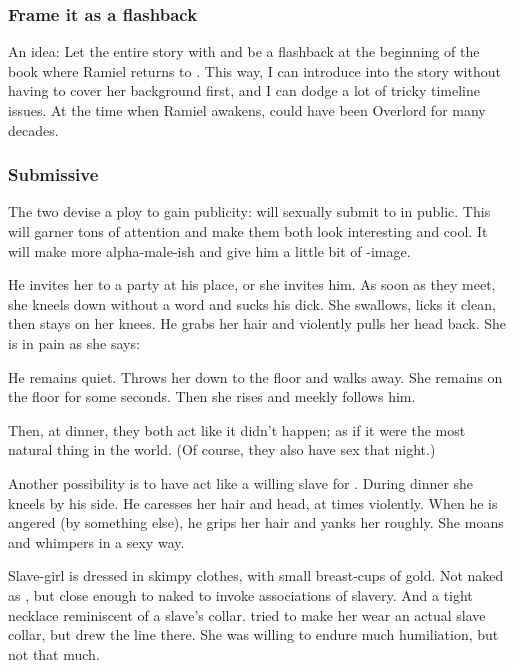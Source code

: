 \subsubsection{Frame it as a flashback}
An idea: Let the entire story with \Cishiel and \Dasteron be a flashback at the beginning of the book where Ramiel returns to \Mystraacht. 
This way, I can introduce \Cishiel into the story without having to cover her background first, and I can dodge a lot of tricky timeline issues. 
At the time when Ramiel awakens, \Dasteron could have been Overlord for many decades. 





\subsubsection{Submissive \Cishiel}
The two devise a ploy to gain publicity: 
\Cishiel{} will sexually submit to \Dasteron{} in public. 
This will garner tons of attention and make them both look interesting and cool. 
It will make \Dasteron{} more alpha-male-ish and give him a little bit of \Zachirah-image. 

He invites her to a party at his place, or she invites him. 
As soon as they meet, she kneels down without a word and sucks his dick. 
She swallows, licks it clean, then stays on her knees. 
He grabs her hair and violently pulls her head back. 
She is in pain as she says: 

He remains quiet. 
Throws her down to the floor and walks away. 
She remains on the floor for some seconds. 
Then she rises and meekly follows him. 

Then, at dinner, they both act like it didn't happen;
as if it were the most natural thing in the world. 
(Of course, they also have sex that night.)

Another possibility is to have \Cishiel{} act like a willing slave for \Dasteron. 
During dinner she kneels by his side. 
He caresses her hair and head, at times violently. 
When he is angered (by something else), he grips her hair and yanks her roughly. 
She moans and whimpers in a sexy way. 

Slave-girl \Cishiel{} is dressed in skimpy clothes, with small breast-cups of gold. 
Not naked as , but close enough to naked to invoke associations of slavery. 
And a tight necklace reminiscent of a slave's collar. 
\Dasteron{} tried to make her wear an actual slave collar, but \Cishiel{} drew the line there. 
She was willing to endure much humiliation, but not that much. 

